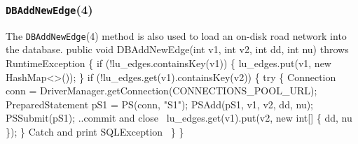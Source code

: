 \documentclass{article}
\def\nwendcode{\endtrivlist \endgroup}      %
\let\nwdocspar=\par
\theoremstyle{definition}                   %
\begin{document}
\subsubsection{{\tt{}\protect{}DBAddNewEdge}(4)}
The {\tt{}\protect{}DBAddNewEdge}(4) method is also used to load an on-disk road network
into the database.
\nwenddocs{}\endmoddef{}
public void DBAddNewEdge(int v1, int v2, int dd, int nu) throws RuntimeException \{
  if (!lu_edges.containsKey(v1)) \{
    lu_edges.put(v1, new HashMap<>());
  \}
  if (!lu_edges.get(v1).containsKey(v2)) \{
    try \{
      Connection conn = DriverManager.getConnection(CONNECTIONS_POOL_URL);
      PreparedStatement pS1 = PS(conn, "S1");
      PSAdd(pS1, v1, v2, dd, nu);
      PSSubmit(pS1);
      \LA{}..commit and close~{\nwtagstyle{}}\RA{}
      lu_edges.get(v1).put(v2, new int[] \{ dd, nu \});
    \}
    \LA{}Catch and print \code{}SQLException\edoc{}~{\nwtagstyle{}}\RA{}
  \}
\}
\eatline
{}\nwendcode{}\nwdocspar
\end{document}

